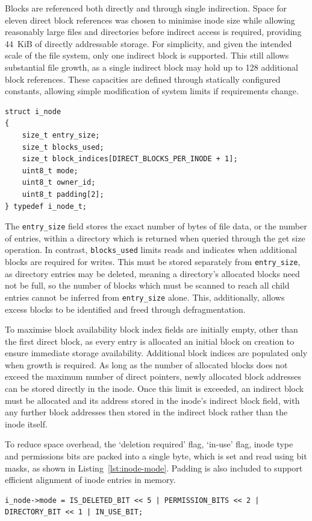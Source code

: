 Blocks are referenced both directly and through single indirection. Space for eleven direct block references was chosen to minimise inode size while allowing reasonably large files and directories before indirect access is required, providing 44~KiB of directly addressable storage. For simplicity, and given the intended scale of the file system, only one indirect block is supported. This still allows substantial file growth, as a single indirect block may hold up to 128 additional block references. These capacities are defined through statically configured constants, allowing simple modification of system limits if requirements change. 
\vspace{0.3cm}
\begin{lstlisting}[caption={inode structure.}, label={lst:inode}]
struct i_node
{
    size_t entry_size;
    size_t blocks_used;
    size_t block_indices[DIRECT_BLOCKS_PER_INODE + 1]; 
    uint8_t mode; 
    uint8_t owner_id;
    uint8_t padding[2];
} typedef i_node_t;
\end{lstlisting}
\vspace{-0.4cm}

The \texttt{entry\_size} field stores the exact number of bytes of file data, or the number of entries, within a directory which is returned when queried through the get size operation. In contrast, \texttt{blocks\_used} limits reads and indicates when additional blocks are required for writes. This must be stored separately from \texttt{entry\_size}, as directory entries may be deleted, meaning a directory’s allocated blocks need not be full, so the number of blocks which must be scanned to reach all child entries cannot be inferred from \texttt{entry\_size} alone. This, additionally, allows excess blocks to be identified and freed through defragmentation. 

To maximise block availability block index fields are initially empty, other than the first direct block, as every entry is allocated an initial block on creation to ensure immediate storage availability. Additional block indices are populated only when growth is required.  As long as the number of allocated blocks does not exceed the maximum number of direct pointers, newly allocated block addresses can be stored directly in the inode. Once this limit is exceeded, an indirect block must be allocated and its address stored in the inode’s indirect block field, with any further block addresses then stored in the indirect block rather than the inode itself. 

To reduce space overhead, the `deletion required' flag, `in-use' flag, inode type and permissions bits are packed into a single byte, which is set and read using bit masks, as shown in Listing~\ref{lst:inode-mode}.  Padding is also included to support efficient alignment of inode entries in memory. 
\vspace{0.3cm}
\begin{lstlisting}[basicstyle=\fontsize{9.2}{7}\ttfamily\selectfont, caption={inode mode field bit packing.}, label={lst:inode-mode}]
i_node->mode = IS_DELETED_BIT << 5 | PERMISSION_BITS << 2 | DIRECTORY_BIT << 1 | IN_USE_BIT;
\end{lstlisting}
\vspace{-0.2cm}

